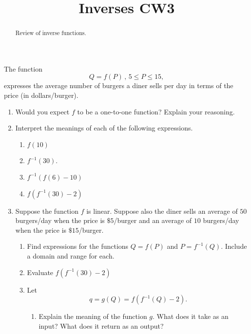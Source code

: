 \documentclass{ximera}
\title{Inverses CW3}
\begin{document}
\begin{abstract}
Review of inverse functions.
\end{abstract}
\maketitle

\begin{question}  \label{Qdf3r344xxz}
The function
\[
       Q = f(P) \, , \, 5 \leq P \leq 15,
\]
expresses the average number of burgers a diner sells per day in terms of the price (in dollars/burger).

\begin{enumerate}

\item Would you expect $f$ to be a one-to-one function? Explain your reasoning.

\item Interpret the meanings of each of the following expressions.

\begin{enumerate}
\item $f(10)$

\item $f^{-1}(30)$.

\item $f^{-1}(f(6)-10)$

\item $f(f^{-1}(30)-2)$



\end{enumerate}

\item Suppose the function $f$ is linear. Suppose also the diner sells an average of $50$ burgers/day when the price is $\$5$/burger and an average of $10$ burgers/day when the price is $\$15$/burger.

\begin{enumerate}
\item Find expressions for the functions $Q=f(P)$ and $P=f^{-1}(Q)$. Include a domain and range for 	each.

\item Evaluate $f(f^{-1}(30)-2)$

\item Let 
\[
      q = g(Q) = f(f^{-1}(Q)-2).   
\]

\begin{enumerate}
\item Explain the meaning of the function $g$. What does it take as an input? What does it return as an output?


\end{enumerate}
\end{enumerate}
\end{enumerate}
\end{question}
\end{document}

